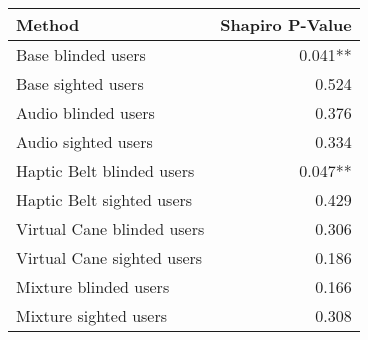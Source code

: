 
\centering
\begin{tabular}{lr}
\toprule
                    Method & Shapiro P-Value \\
\midrule
        Base blinded users &         0.041** \\
        Base sighted users &           0.524 \\
       Audio blinded users &           0.376 \\
       Audio sighted users &           0.334 \\
 Haptic Belt blinded users &         0.047** \\
 Haptic Belt sighted users &           0.429 \\
Virtual Cane blinded users &           0.306 \\
Virtual Cane sighted users &           0.186 \\
     Mixture blinded users &           0.166 \\
     Mixture sighted users &           0.308 \\
\bottomrule
\end{tabular}
